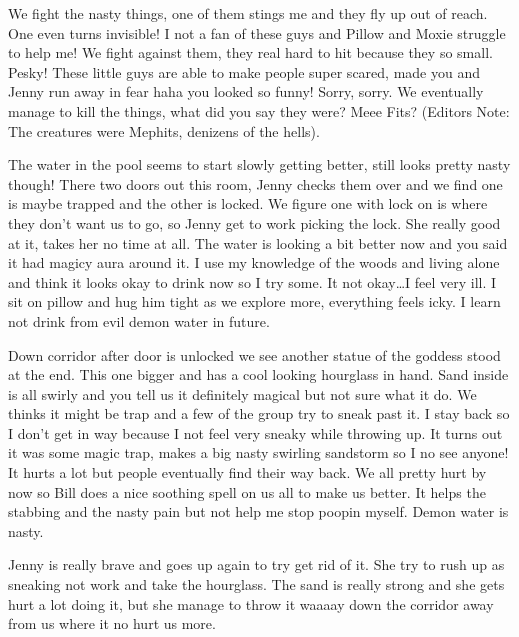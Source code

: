 We fight the nasty things, one of them stings me and they fly up out of reach. One even turns invisible! I not a fan of these guys and Pillow and Moxie struggle to help me! We fight against them, they real hard to hit because they so small. Pesky! These little guys are able to make people super scared, made you and Jenny run away in fear haha you looked so funny! Sorry, sorry. We eventually manage to kill the things, what did you say they were? Meee Fits? (Editors Note: The creatures were Mephits, denizens of the hells).\medskip

The water in the pool seems to start slowly getting better, still looks pretty nasty though! There two doors out this room, Jenny checks them over and we find one is maybe trapped and the other is locked. We figure one with lock on is where they don’t want us to go, so Jenny get to work picking the lock. She really good at it, takes her no time at all. The water is looking a bit better now and you said it had magicy aura around it. I use my knowledge of the woods and living alone and think it looks okay to drink now so I try some. It not okay…I feel very ill. I sit on pillow and hug him tight as we explore more, everything feels icky. I learn not drink from evil demon water in future.\medskip

Down corridor after door is unlocked we see another statue of the goddess stood at the end. This one bigger and has a cool looking hourglass in hand. Sand inside is all swirly and you tell us it definitely magical but not sure what it do. We thinks it might be trap and a few of the group try to sneak past it. I stay back so I don’t get in way because I not feel very sneaky while throwing up. It turns out it was some magic trap, makes a big nasty swirling sandstorm so I no see anyone! It hurts a lot but people eventually find their way back. We all pretty hurt by now so Bill does a nice soothing spell on us all to make us better. It helps the stabbing and the nasty pain but not help me stop poopin myself. Demon water is nasty.\medskip

Jenny is really brave and goes up again to try get rid of it. She try to rush up as sneaking not work and take the hourglass. The sand is really strong and she gets hurt a lot doing it, but she manage to throw it waaaay down the corridor away from us where it no hurt us more.\medskip

